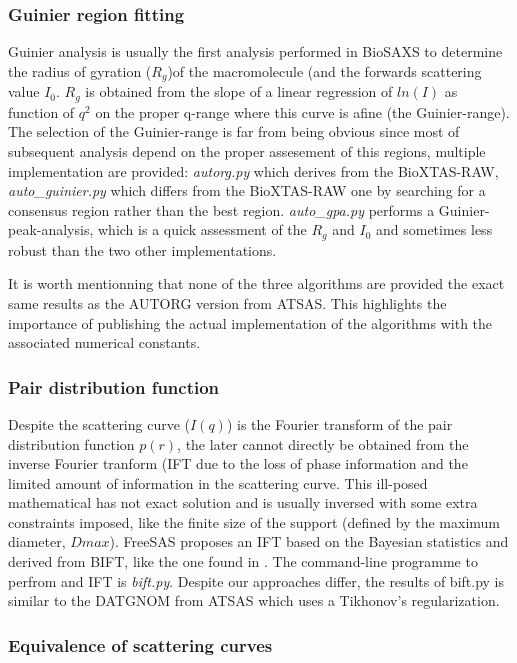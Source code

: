 \documentclass[preprint]{iucr}              %
\begin{document}
\subsubsection{Guinier region fitting}
Guinier analysis \cite{guinier} is usually the first analysis performed in BioSAXS to determine the radius of gyration ($R_g$)of the macromolecule (and the forwards scattering value $I_0$.
$R_g$ is obtained from the slope of a linear regression of $ln(I)$ as function of $q^2$ on the proper q-range where this curve is afine (the Guinier-range).
The selection of the Guinier-range is far from being obvious since most of subsequent analysis depend on the proper assesement of this regions, 
multiple implementation are provided: \textit{autorg.py} which derives from the BioXTAS-RAW\cite{BioXTAS}, \textit{auto_guinier.py} which differs from the BioXTAS-RAW
one by searching for a consensus region rather than the best region. 
\textit{auto_gpa.py} performs a Guinier-peak-analysis\cite{gpa}, which is a quick assessment of the $R_g$ and $I_0$ and sometimes less robust than the two other implementations. 

It is worth mentionning that none of the three algorithms are provided the exact same results as the AUTORG\cite{ATSAS2} version from ATSAS. 
This highlights the importance of publishing the actual implementation of the algorithms with the associated numerical constants.
  
\subsubsection{Pair distribution function}
Despite the scattering curve ($I(q)$) is the Fourier transform of the pair distribution function $p(r)$, the later cannot directly be obtained from the
inverse Fourier tranform (IFT due to the loss of phase information and the limited amount of information in the scattering curve. 
This ill-posed mathematical has not exact solution and is usually inversed with some extra constraints imposed, like the finite size of the support (defined by the maximum diameter, $Dmax$).    
FreeSAS proposes an IFT based on the Bayesian statistics and derived from BIFT\cite{bift}, like the one found in \cite{BioXTAS-RAW}.
The command-line programme to perfrom and IFT is \textit{bift.py}. 
Despite our approaches differ, the results of bift.py is similar to the DATGNOM\cite{ATSAS1} from ATSAS which uses a Tikhonov's regularization.

\subsubsection{Equivalence of scattering curves}
\end{document}
